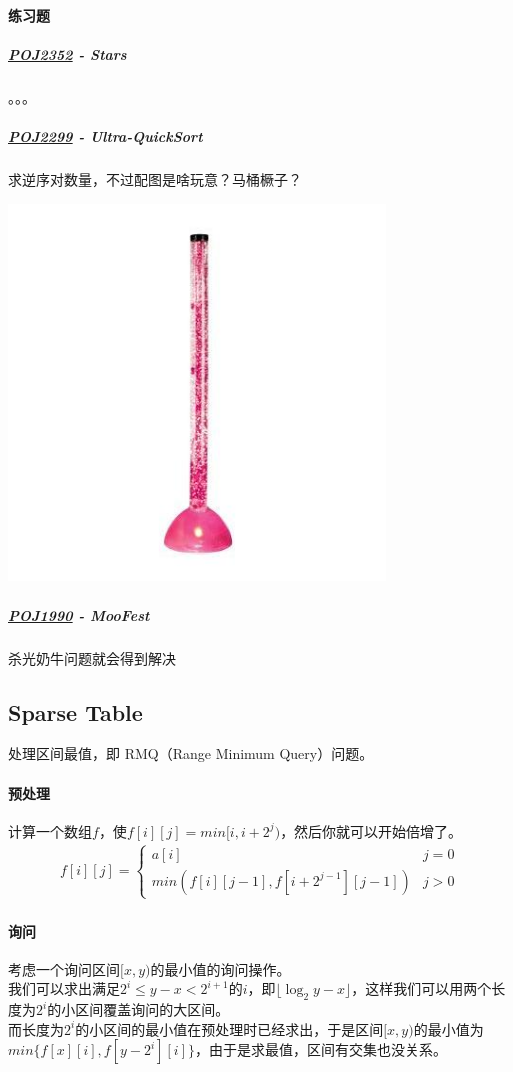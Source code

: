 \documentclass[]{cpp}
\begin{document}
\paragraph{练习题}
\subparagraph{\href{http://poj.org/problem?id=2352}{POJ2352} - Stars} 。。。
\subparagraph{\href{http://poj.org/problem?id=2299}{POJ2299} - Ultra-QuickSort} 求逆序对数量，不过配图是啥玩意？马桶橛子？
\begin{center}\includegraphics[height=10cm]{assets/day4/poj2299.jpg}\end{center}
\subparagraph{\href{http://poj.org/problem?id=1990}{POJ1990} - MooFest} 杀光奶牛问题就会得到解决
\subsection{Sparse Table} 处理区间最值，即 RMQ（Range Minimum Query）问题。
\paragraph{预处理} 计算一个数组$f$，使$f[i][j]=min[i,i+2^j)$，然后你就可以开始倍增了。
	\begin{eqnarray}
	f[i][j]=\left\{\begin{array}{lr}
		a[i] & j=0 \\
		min(f[i][j-1],f[i+2^{j-1}][j-1]) & j>0
		\end{array}\right.
	\end{eqnarray}
\paragraph{询问}
	考虑一个询问区间$[x,y)$的最小值的询问操作。\\
	我们可以求出满足$2^i\le y-x < 2^{i+1}$的$i$，即$\lfloor\log_2{y-x}\rfloor$，这样我们可以用两个长度为$2^i$的小区间覆盖询问的大区间。\\
	而长度为$2^i$的小区间的最小值在预处理时已经求出，于是区间$[x,y)$的最小值为$min\{f[x][i],f[y-2^i][i]\}$，由于是求最值，区间有交集也没关系。
\end{document}
